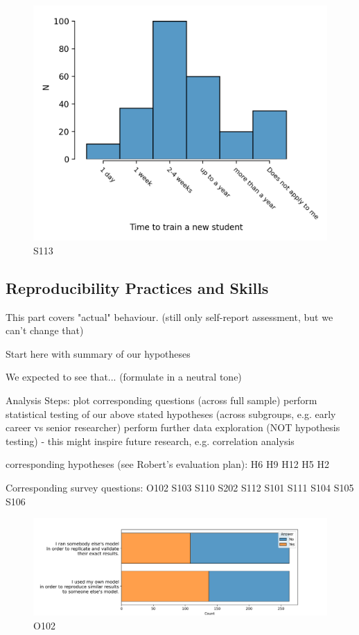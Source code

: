 \documentclass{article}
\begin{document}
\begin{figure}[h!]
    \centering
    \includegraphics[width=\textwidth]{../figs/S113.png}
	\caption{S113 }
    \label{fig:S113}
\end{figure}


\subsection{Reproducibility Practices and Skills}

This part covers "actual" behaviour. (still only self-report assessment, but we can't change that)

    Start here with summary of our hypotheses

We expected to see that... (formulate in a neutral tone)

    Analysis Steps:
        plot corresponding questions (across full sample)
        perform statistical testing of our above stated hypotheses (across subgroups, e.g. early career vs senior researcher)
        perform further data exploration (NOT hypothesis testing) - this might inspire future research, e.g. correlation analysis

    corresponding hypotheses (see Robert's evaluation plan):
        H6
        H9
        H12
        H5
        H2

    Corresponding survey questions:
        O102
        S103
        S110
        S202
        S112
        S101
        S111
        S104
        S105
        S106

\begin{figure}[h!]
    \centering
    \includegraphics[width=\textwidth]{../figs/O102.png}
	\caption{O102 }
    \label{fig:O102}
\end{figure}
\end{document}
